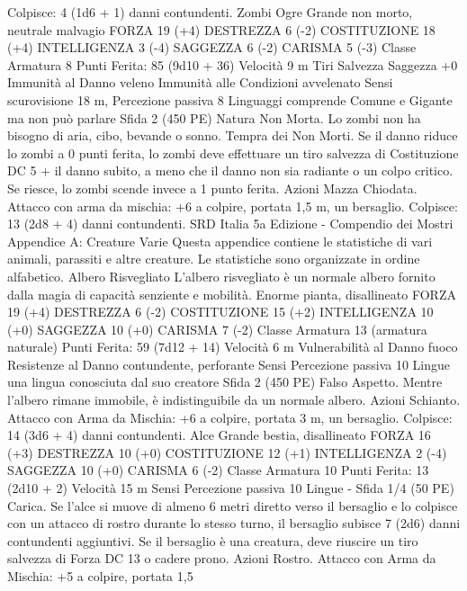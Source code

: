\begin{multicols}{2}
Colpisce: 4 (1d6 + 1) danni contundenti.
Zombi Ogre
Grande non morto, neutrale malvagio
FORZA 19 (+4)
DESTREZZA 6 (-2)
COSTITUZIONE 18 (+4)
INTELLIGENZA 3 (-4)
SAGGEZZA 6 (-2)
CARISMA 5 (-3)
Classe Armatura 8
\hspace*{0pt}\hfill{Punti Ferita}: 85 (9d10 + 36)
Velocità 9 m
Tiri Salvezza Saggezza +0
Immunità al Danno veleno
Immunità alle Condizioni avvelenato
Sensi scurovisione 18 m, Percezione passiva 8
Linguaggi comprende Comune e Gigante ma non può parlare
Sfida 2 (450 PE)
Natura Non Morta. Lo zombi non ha bisogno di aria, cibo,
bevande o sonno.
Tempra dei Non Morti. Se il danno riduce lo zombi a 0 punti
ferita, lo zombi deve effettuare un tiro salvezza di Costituzione
DC 5 + il danno subito, a meno che il danno non sia radiante o
un colpo critico. Se riesce, lo zombi scende invece a 1 punto
ferita.
Azioni
Mazza Chiodata. Attacco con arma da mischia: +6 a colpire,
portata 1,5 m, un bersaglio.
Colpisce: 13 (2d8 + 4) danni contundenti.
SRD Italia 5a Edizione - Compendio dei Mostri
Appendice A: Creature
Varie
Questa appendice contiene le statistiche di vari animali,
parassiti e altre creature. Le statistiche sono
organizzate in ordine alfabetico.
Albero Risvegliato
L’albero risvegliato è un normale albero fornito dalla
magia di capacità senziente e mobilità.
Enorme pianta, disallineato
FORZA 19 (+4)
DESTREZZA 6 (-2)
COSTITUZIONE 15 (+2)
INTELLIGENZA 10 (+0)
SAGGEZZA 10 (+0)
CARISMA 7 (-2)
Classe Armatura 13 (armatura naturale)
\hspace*{0pt}\hfill{Punti Ferita}: 59 (7d12 + 14)
Velocità 6 m
Vulnerabilità al Danno fuoco
Resistenze al Danno contundente, perforante
Sensi Percezione passiva 10
Lingue una lingua conosciuta dal suo creatore
Sfida 2 (450 PE)
Falso Aspetto. Mentre l’albero rimane immobile, è
indistinguibile da un normale albero.
Azioni
Schianto. Attacco con Arma da Mischia: +6 a colpire, portata 3
m, un bersaglio.
Colpisce: 14 (3d6 + 4) danni contundenti.
Alce
Grande bestia, disallineato
FORZA 16 (+3)
DESTREZZA 10 (+0)
COSTITUZIONE 12 (+1)
INTELLIGENZA 2 (-4)
SAGGEZZA 10 (+0)
CARISMA 6 (-2)
Classe Armatura 10
\hspace*{0pt}\hfill{Punti Ferita}: 13 (2d10 + 2)
Velocità 15 m
Sensi Percezione passiva 10
Lingue -
Sfida 1/4 (50 PE)
Carica. Se l’alce si muove di almeno 6 metri diretto verso il
bersaglio e lo colpisce con un attacco di rostro durante lo stesso
turno, il bersaglio subisce 7 (2d6) danni contundenti aggiuntivi.
Se il bersaglio è una creatura, deve riuscire un tiro salvezza di
Forza DC 13 o cadere prono.
Azioni
Rostro. Attacco con Arma da Mischia: +5 a colpire, portata 1,5

\end{multicols}
